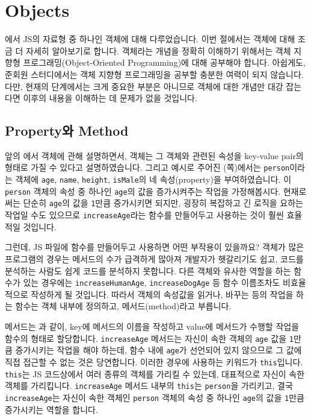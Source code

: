 \section{Objects} \label{sect:objects}

에서 JS의 자료형 중 하나인 객체에 대해 다루었습니다. 이번 절에서는 객체에 대해 조금 더 자세히 알아보기로 합니다. 객체라는 개념을 정확히 이해하기 위해서는 객체 지향형 프로그래밍(Object-Oriented Programming)에 대해 공부해야 합니다. 아쉽게도, 준회원 스터디에서는 객체 지향형 프로그래밍을 공부할 충분한 여력이 되지 않습니다. 다만, 현재의 단계에서는 크게 중요한 부분은 아니므로 객체에 대한 개념만 대강 잡는다면 이후의 내용을 이해하는 데 문제가 없을 것입니다. 

\subsection*{Property와 Method}

앞의 에서 객체에 관해 설명하면서, 객체는 그 객체와 관련된 속성을 key-value pair의 형태로 가질 수 있다고 설명하였습니다. 그리고 예시로 주어진 (\pageref{code:object-type}쪽)에서는 \verb|person|이라는 객체에 \verb|age|, \verb|name|, \verb|height|, \verb|isMale|의 네 속성(property)을 부여하였습니다. 이 \verb|person| 객체의 속성 중 하나인 \verb|age|의 값을 증가시켜주는 작업을 가정해봅시다. 현재로써는 단순히 \verb|age|의 값을 \verb|1|만큼 증가시키면 되지만, 굉장히 복잡하고 긴 로직을 요하는 작업일 수도 있으므로 \verb|increaseAge|라는 함수를 만들어두고 사용하는 것이 훨씬 효율적일 것입니다. 

그런데, JS 파일에 함수를 만들어두고 사용하면 어떤 부작용이 있을까요? 객체가 많은 프로그램의 경우는 메서드의 수가 급격하게 많아져 개발자가 헷갈리기도 쉽고, 코드를 분석하는 사람도 쉽게 코드를 분석하지 못합니다. 다른 객체와 유사한 역할을 하는 함수가 있는 경우에는 \verb|increaseHumanAge|, \verb|increaseDogAge| 등 함수 이름조차도 비효율적으로 작성하게 될 것입니다. 따라서 객체의 속성값을 읽거나, 바꾸는 등의 작업을 하는 함수는 객체 내부에 정의하고, 메서드(method)라고 부릅니다. 

메서드는 과 같이, key에 메서드의 이름을 작성하고 value에 메서드가 수행할 작업을 함수의 형태로 할당합니다. \verb|increaseAge| 메서드는 자신이 속한 객체의 \verb|age| 값을 \verb|1|만큼 증가시키는 작업을 해야 하는데, 함수 내에 \verb|age|가 선언되어 있지 않으므로 그 값에 직접 접근할 수 없는 것은 당연합니다. 이러한 경우에 사용하는 키워드가 \verb|this|입니다. \verb|this|는 JS 코드상에서 여러 종류의 객체를 가리킬 수 있는데, 대표적으로 자신이 속한 객체를 가리킵니다. \verb|increaseAge| 메서드 내부의 \verb|this|는 \verb|person|을 가리키고, 결국 \verb|increaseAge|는 자신이 속한 객체인 \verb|person| 객체의 속성 중 하나인 \verb|age|의 값을 \verb|1|만큼 증가시키는 역할을 합니다. 

